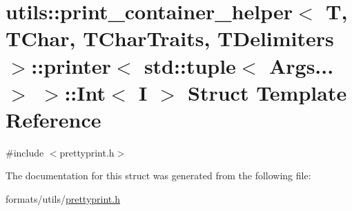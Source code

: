 \hypertarget{structutils_1_1print__container__helper_1_1printer_3_01std_1_1tuple_3_01_args_8_8_8_01_4_01_4_1_1_int}{}\section{utils\+::print\+\_\+container\+\_\+helper$<$ T, T\+Char, T\+Char\+Traits, T\+Delimiters $>$\+::printer$<$ std\+::tuple$<$ Args... $>$ $>$\+::Int$<$ I $>$ Struct Template Reference}
\label{structutils_1_1print__container__helper_1_1printer_3_01std_1_1tuple_3_01_args_8_8_8_01_4_01_4_1_1_int}


{\ttfamily \#include $<$prettyprint.\+h$>$}



The documentation for this struct was generated from the following file\+:\begin{DoxyCompactItemize}
\item 
formats/utils/\mbox{\hyperlink{prettyprint_8h}{prettyprint.\+h}}\end{DoxyCompactItemize}
